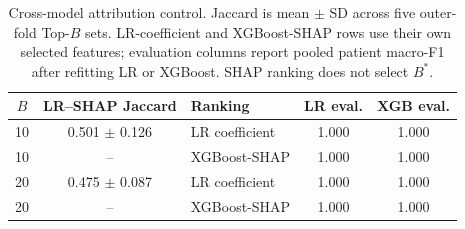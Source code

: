 \begin{table}[H]
\centering
\scriptsize
\setlength{\tabcolsep}{3pt}
\begin{tabular}{cclcc}
\toprule
$B$ & LR--SHAP Jaccard & Ranking & LR eval. & XGB eval. \\
\midrule
10 & 0.501 $\pm$ 0.126 & LR coefficient & 1.000 & 1.000 \\
10 & -- & XGBoost-SHAP & 1.000 & 1.000 \\
20 & 0.475 $\pm$ 0.087 & LR coefficient & 1.000 & 1.000 \\
20 & -- & XGBoost-SHAP & 1.000 & 1.000 \\
\bottomrule
\end{tabular}
\caption{Cross-model attribution control. Jaccard is mean $\pm$ SD across five outer-fold Top-$B$ sets. LR-coefficient and XGBoost-SHAP rows use their own selected features; evaluation columns report pooled patient macro-F1 after refitting LR or XGBoost. SHAP ranking does not select $B^*$.}
\label{tab:psas_shap}
\end{table}
